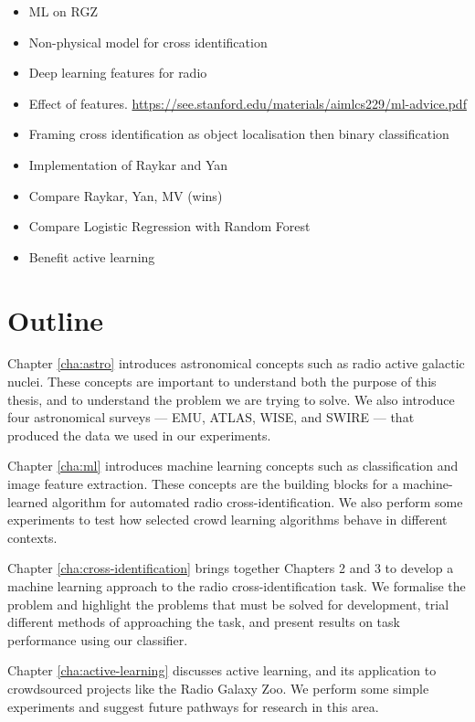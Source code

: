   \begin{itemize}
    \item ML on RGZ
    \item Non-physical model for cross identification
    \item Deep learning features for radio
    \item Effect of features. \url{https://see.stanford.edu/materials/aimlcs229/ml-advice.pdf}
    \item Framing cross identification as object localisation then binary classification
    \item Implementation of Raykar and Yan
    \item Compare Raykar, Yan, MV (wins)
    \item Compare Logistic Regression with Random Forest
    \item Benefit active learning
  \end{itemize}

\section{Outline}
\label{sec:outline}
  
  Chapter \ref{cha:astro} introduces astronomical concepts such as radio active
  galactic nuclei. These concepts are important to understand both the purpose
  of this thesis, and to understand the problem we are trying to solve. We also
  introduce four astronomical surveys --- EMU, ATLAS, WISE, and SWIRE --- that
  produced the data we used in our experiments.

  Chapter \ref{cha:ml} introduces machine learning concepts such as
  classification and image feature extraction. These concepts are the building
  blocks for a machine-learned algorithm for automated radio
  cross-identification. We also perform some experiments to test how selected
  crowd learning algorithms behave in different contexts.

  Chapter \ref{cha:cross-identification} brings together Chapters 2 and 3 to
  develop a machine learning approach to the radio cross-identification task. We
  formalise the problem and highlight the problems that must be solved for
  development, trial different methods of approaching the task, and present
  results on task performance using our classifier.

  Chapter \ref{cha:active-learning} discusses active learning, and its
  application to crowdsourced projects like the Radio Galaxy Zoo. We perform
  some simple experiments and suggest future pathways for research in this area.


